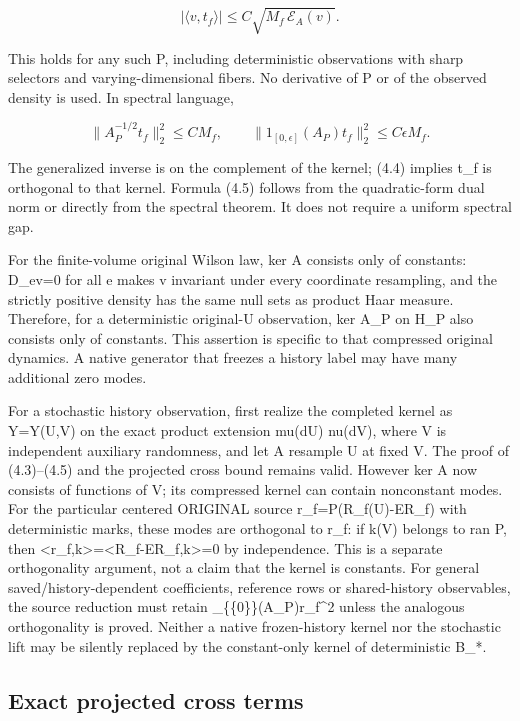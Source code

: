 \documentclass[
  11pt,
]{article}
\begin{document}
\[
 \boxed{\quad
 |\langle v,t_f\rangle|
 \le C\sqrt{M_f\,\mathcal E_A(v)}.
 \quad}
 \tag{4.4}
\]

This holds for any such P, including deterministic observations with
sharp selectors and varying-dimensional fibers. No derivative of P or of
the observed density is used. In spectral language,

\[
 \|A_P^{-1/2}t_f\|_2^2\le CM_f,
 \qquad
 \|1_{[0,\epsilon]}(A_P)t_f\|_2^2\le C\epsilon M_f.
 \tag{4.5}
\]

The generalized inverse is on the complement of the kernel; (4.4)
implies t\_f is orthogonal to that kernel. Formula (4.5) follows from
the quadratic-form dual norm or directly from the spectral theorem. It
does not require a uniform spectral gap.

For the finite-volume original Wilson law, ker A consists only of
constants: D\_ev=0 for all e makes v invariant under every coordinate
resampling, and the strictly positive density has the same null sets as
product Haar measure. Therefore, for a deterministic original-U
observation, ker A\_P on H\_P also consists only of constants. This
assertion is specific to that compressed original dynamics. A native
generator that freezes a history label may have many additional zero
modes.

For a stochastic history observation, first realize the completed kernel
as Y=Y(U,V) on the exact product extension mu(dU) nu(dV), where V is
independent auxiliary randomness, and let A resample U at fixed V. The
proof of (4.3)--(4.5) and the projected cross bound remains valid.
However ker A now consists of functions of V; its compressed kernel can
contain nonconstant modes. For the particular centered ORIGINAL source
r\_f=P(R\_f(U)-ER\_f) with deterministic marks, these modes are
orthogonal to r\_f: if k(V) belongs to ran P, then
\textless r\_f,k\textgreater=\textless R\_f-ER\_f,k\textgreater=0 by
independence. This is a separate orthogonality argument, not a claim
that the kernel is constants. For general saved/history-dependent
coefficients, reference rows or shared-history observables, the source
reduction must retain
\textbar{}\_\{\{0\}\}(A\_P)r\_f\textbar\textbar\^{}2 unless the
analogous orthogonality is proved. Neither a native frozen-history
kernel nor the stochastic lift may be silently replaced by the
constant-only kernel of deterministic B\_*.

\hypertarget{exact-projected-cross-terms}{%
\subsection{Exact projected cross
terms}\label{exact-projected-cross-terms}}
\end{document}

